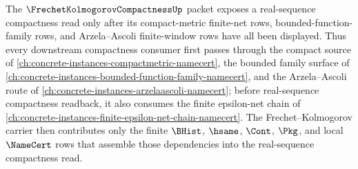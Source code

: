 The $\FrechetKolmogorovCompactnessUp$ packet exposes a real-sequence compactness read only after its compact-metric finite-net rows, bounded-function-family rows, and Arzela--Ascoli finite-window rows have all been displayed. Thus every downstream compactness consumer first passes through the compact source of \autoref{ch:concrete-instances-compactmetric-namecert}, the bounded family surface of \autoref{ch:concrete-instances-bounded-function-family-namecert}, and the Arzela--Ascoli route of \autoref{ch:concrete-instances-arzelaascoli-namecert}; before real-sequence compactness readback, it also consumes the finite epsilon-net chain of \autoref{ch:concrete-instances-finite-epsilon-net-chain-namecert}. The Frechet--Kolmogorov carrier then contributes only the finite $\BHist$, $\hsame$, $\Cont$, $\Pkg$, and local $\NameCert$ rows that assemble those dependencies into the real-sequence compactness read.
